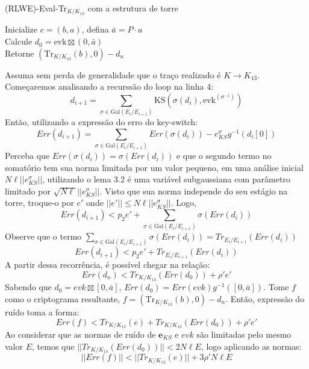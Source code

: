 \begin{algorithm}[H]
\caption{(RLWE)-Eval-Tr\(_{K/K_{13}}\) com a estrutura de torre}


Inicialize \(c = (b, a)\), defina \(\bar{a} = P \cdot a\) \\
Calcule \(d_0 = \text{evk} \boxtimes (0, \bar{a})\) \\
Retorne \((\text{Tr}_{K/K_{13}}(b), 0) - d_n\) 

\end{algorithm}
Assuma sem perda de generalidade que o traço realizado é $K \rightarrow K_{13}$.
Começaremos analisando a recurssão do loop na linha 4:
$$
d_{i+1} = \sum_{\sigma \in \text{Gal}(E_i/E_{i+1})} \text{KS}( \sigma(d_i), \text{evk}^{(\sigma^{-1})})
$$
Então, utilizando a expressão do erro do key-switch:
$$
Err(d_{i+1}) = \sum_{\sigma \in \text{Gal}(E_i/E_{i+1})} Err(\sigma(d_i)) - e_{KS}^{\sigma} g^{-1}(d_i[0])
$$
Perceba que $Err(\sigma(d_i)) = \sigma(Err(d_i))$ e que o segundo termo no somatório tem sua norma limitada por um valor pequeno,
em uma análise inicial $N\ell ||e_{KS}^{\sigma}||$, utilizando o lema 3.2 é uma variável subgaussiana com parâmetro limitado por 
$\sqrt{N\ell} ||e_{KS}^{\sigma}||$. Visto que sua norma independe do seu estágio na torre, troque-o por $e'$ onde $||e'|| \le  N\ell ||e_{KS}^{\sigma}||$. Logo, 
$$
Err(d_{i+1}) < p_2 e'+ \sum_{\sigma \in \text{Gal}(E_i/E_{i+1})} \sigma(Err(d_i))
$$
Observe que o termo $\sum_{\sigma \in \text{Gal}(E_i/E_{i+1})} \sigma(Err(d_i)) = Tr_{E_i / E_{i+1}}(Err(d_i))$ 
$$
Err(d_{i+1}) < p_2 e' + Tr_{E_i/E_{i+1}}(Err(d_i))
$$
A partir dessa recorrência, é possível chegar na relação:
$$
Err(d_{n}) < Tr_{K / K_{13}}(Err(d_0)) + \rho' e'
$$
Sabendo que $d_0 = evk \boxtimes [0, \bar{a}]$, $Err(d_0) = Err(evk) g^{-1}([0, \bar{a}])$.
Tome $f$ como o criptograma resultante, $f = (\text{Tr}_{K/K_{13}}(b), 0) - d_n$. Então, expressão  do ruído toma a forma:
$$
Err(f) < Tr_{K / K_{13}}(e) + Tr_{K /K_{13}}(Err(d_0)) + \rho' e'
$$
Ao considerar que as normas de ruído de $\mathbf{e}_{KS}$ e $evk$ são limitadas pelo mesmo valor $E$, temos que $||Tr_{K /K_{13}}(Err(d_0))|| < 2N \ell E$, logo
aplicando as normas:
$$
||Err(f)|| < ||Tr_{K /K_{13}}(e)|| +  3 \rho'N\ell E
$$

